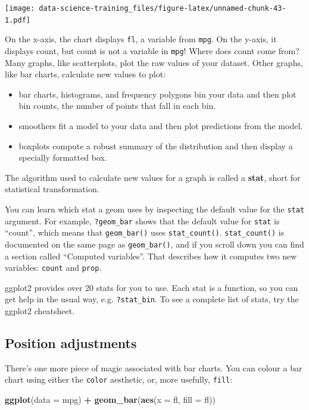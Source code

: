 \documentclass[]{book}
\newenvironment{Shaded}{\begin{snugshade}}{\end{snugshade}}
\newcommand{\KeywordTok}[1]{\textcolor[rgb]{0.13,0.29,0.53}{\textbf{#1}}}
\newcommand{\DataTypeTok}[1]{\textcolor[rgb]{0.13,0.29,0.53}{#1}}
\newcommand{\StringTok}[1]{\textcolor[rgb]{0.31,0.60,0.02}{#1}}
\newcommand{\OperatorTok}[1]{\textcolor[rgb]{0.81,0.36,0.00}{\textbf{#1}}}
\newcommand{\NormalTok}[1]{#1}
\theoremstyle{definition}
\theoremstyle{definition}
\theoremstyle{definition}
\theoremstyle{remark}
\begin{document}
\texttt{[image: data-science-training\_files/figure-latex/unnamed-chunk-43-1.pdf]}

On the x-axis, the chart displays \texttt{fl}, a variable from
\texttt{mpg}. On the y-axis, it displays count, but count is not a
variable in \texttt{mpg}! Where does count come from? Many graphs, like
scatterplots, plot the raw values of your dataset. Other graphs, like
bar charts, calculate new values to plot:

\begin{itemize}
\item
  bar charts, histograms, and frequency polygons bin your data and then
  plot bin counts, the number of points that fall in each bin.
\item
  smoothers fit a model to your data and then plot predictions from the
  model.
\item
  boxplots compute a robust summary of the distribution and then display
  a specially formatted box.
\end{itemize}

The algorithm used to calculate new values for a graph is called a
\textbf{stat}, short for statistical transformation.

You can learn which stat a geom uses by inspecting the default value for
the \texttt{stat} argument. For example, \texttt{?geom\_bar} shows that
the default value for \texttt{stat} is ``count'', which means that
\texttt{geom\_bar()} uses \texttt{stat\_count()}. \texttt{stat\_count()}
is documented on the same page as \texttt{geom\_bar()}, and if you
scroll down you can find a section called ``Computed variables''. That
describes how it computes two new variables: \texttt{count} and
\texttt{prop}.

ggplot2 provides over 20 stats for you to use. Each stat is a function,
so you can get help in the usual way, e.g. \texttt{?stat\_bin}. To see a
complete list of stats, try the ggplot2 cheatsheet.

\subsection{Position adjustments}\label{position-adjustments}

There's one more piece of magic associated with bar charts. You can
colour a bar chart using either the \texttt{color} aesthetic, or, more
usefully, \texttt{fill}:

\begin{Shaded}
\begin{Highlighting}[]
\KeywordTok{ggplot}\NormalTok{(}\DataTypeTok{data =}\NormalTok{ mpg) }\OperatorTok{+}\StringTok{ }
\StringTok{  }\KeywordTok{geom_bar}\NormalTok{(}\KeywordTok{aes}\NormalTok{(}\DataTypeTok{x =}\NormalTok{ fl, }\DataTypeTok{fill =}\NormalTok{ fl))}
\end{Highlighting}
\end{Shaded}
\end{document}
